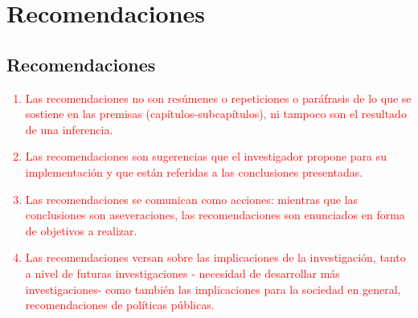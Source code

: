 \chapter{Recomendaciones}
\thispagestyle{empty}

\section{Recomendaciones}

\textcolor{red}{\begin{enumerate}
	\item Las recomendaciones no son resúmenes o repeticiones o paráfrasis de lo que se sostiene en las premisas (capítulos-subcapítulos), ni tampoco son el resultado de una inferencia.
	\item Las recomendaciones son sugerencias que el investigador propone para su implementación y que están referidas a las conclusiones presentadas.
	\item Las recomendaciones se comunican como acciones: mientras que las conclusiones son aseveraciones, las recomendaciones son enunciados en forma de objetivos a realizar.
	\item Las recomendaciones versan sobre las implicaciones de la investigación, tanto a nivel de futuras investigaciones - necesidad de desarrollar más investigaciones- como también las implicaciones para la sociedad en general, recomendaciones de políticas públicas.
\end{enumerate}}
